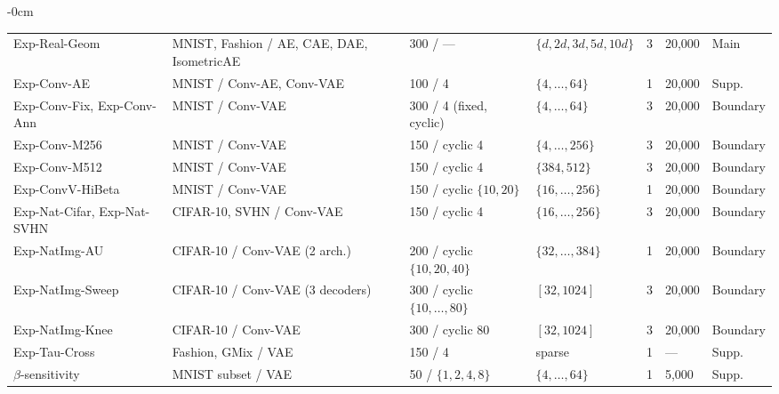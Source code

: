 \documentclass[make,article,submit,pdftex,moreauthors]{Definitions/mdpi}
\begin{document}
\begin{table}[H]
\begin{adjustwidth}{-\extralength}{0cm}
\begin{tabular}{p{3.2cm}p{3.3cm}p{2.4cm}p{3.0cm}cp{1.2cm}p{1.8cm}}
Exp-Real-Geom & MNIST, Fashion / AE, CAE, DAE, IsometricAE & 300 / --- & $\{d,2d,3d,5d,10d\}$ & 3 & 20,000 & Main \\
Exp-Conv-AE & MNIST / Conv-AE, Conv-VAE & 100 / 4 & $\{4,\ldots,64\}$ & 1 & 20,000 & Supp. \\
Exp-Conv-Fix, Exp-Conv-Ann & MNIST / Conv-VAE & 300 / 4 (fixed, cyclic) & $\{4,\ldots,64\}$ & 3 & 20,000 & Boundary \\
Exp-Conv-M256 & MNIST / Conv-VAE & 150 / cyclic 4 & $\{4,\ldots,256\}$ & 3 & 20,000 & Boundary \\
Exp-Conv-M512 & MNIST / Conv-VAE & 150 / cyclic 4 & $\{384,512\}$ & 3 & 20,000 & Boundary \\
Exp-ConvV-HiBeta & MNIST / Conv-VAE & 150 / cyclic $\{10,20\}$ & $\{16,\ldots,256\}$ & 1 & 20,000 & Boundary \\
Exp-Nat-Cifar, Exp-Nat-SVHN & CIFAR-10, SVHN / Conv-VAE & 150 / cyclic 4 & $\{16,\ldots,256\}$ & 3 & 20,000 & Boundary \\
Exp-NatImg-AU & CIFAR-10 / Conv-VAE (2 arch.) & 200 / cyclic $\{10,20,40\}$ & $\{32,\ldots,384\}$ & 1 & 20,000 & Boundary \\
Exp-NatImg-Sweep & CIFAR-10 / Conv-VAE (3 decoders) & 300 / cyclic $\{10,\ldots,80\}$ & $[32,1024]$ & 3 & 20,000 & Boundary \\
Exp-NatImg-Knee & CIFAR-10 / Conv-VAE & 300 / cyclic 80 & $[32,1024]$ & 3 & 20,000 & Boundary \\
Exp-Tau-Cross & Fashion, GMix / VAE & 150 / 4 & sparse & 1 & --- & Supp. \\
$\beta$-sensitivity & MNIST subset / VAE & 50 / $\{1,2,4,8\}$ & $\{4,\ldots,64\}$ & 1 & 5,000 & Supp. \\
\bottomrule
\end{tabular}
\end{adjustwidth}
\end{table}
\end{document}
